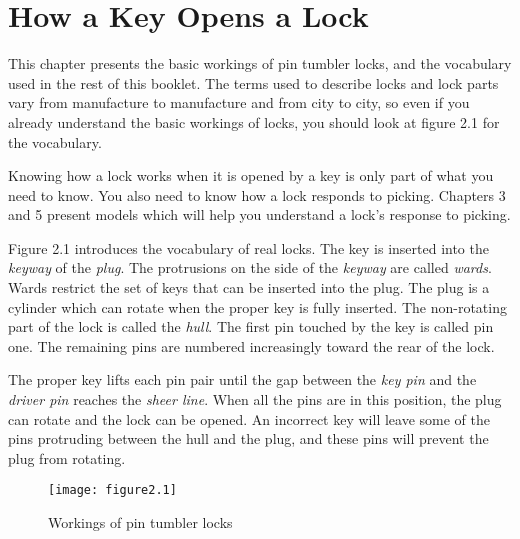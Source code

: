 \chapter{How a Key Opens a Lock}
This chapter presents the basic workings of pin tumbler locks, and the vocabulary used in the rest of this booklet.
The terms used to describe locks and lock parts vary from manufacture to manufacture and from city to city, so even if you already understand the basic workings of locks, you should look at figure 2.1 for the vocabulary.

Knowing how a lock works when it is opened by a key is only part of what you need to know.
You also need to know how a lock responds to picking. Chapters 3 and 5 present models which will help you understand a lock's response to picking.

Figure 2.1 introduces the vocabulary of real locks.
The key is inserted into the \textit{keyway} of the \textit{plug}.
The protrusions on the side of the \textit{keyway} are called \textit{wards}.
Wards restrict the set of keys that can be inserted into the plug.
The plug is a cylinder which can rotate when the proper key is fully inserted.
The non-rotating part of the lock is called the \textit{hull}.
The first pin touched by the key is called pin one.
The remaining pins are numbered increasingly toward the rear of the lock.

The proper key lifts each pin pair until the gap between the \textit{key pin} and the \textit{driver pin} reaches the \textit{sheer line}.
When all the pins are in this position, the plug can rotate and the lock can be opened.
An incorrect key will leave some of the pins protruding between the hull and the plug, and these pins will prevent the plug from rotating.

\begin{figure}
    \texttt{[image: figure2.1]}
    \caption{Workings of pin tumbler locks}
\end{figure}

